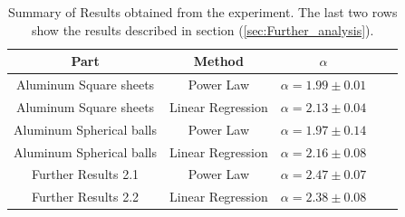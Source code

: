 \documentclass[a4paper,12pt]{article}
\begin{document}
\begin{table}[h!]
    \centering
    \caption{Summary of Results obtained from the experiment. The last two rows show the results described in section (\ref{sec:Further_analysis}).}
    \label{tab:summary_results}
    \begin{tabular}{|c|c|c|c|c|}
    \hline
    \textbf{Part} & \textbf{Method} & \textbf{$\alpha$}   \\ \hline
    Aluminum Square sheets & Power Law & $\alpha = 1.99 \pm 0.01$   \\ \hline
    Aluminum Square sheets & Linear Regression & $\alpha = 2.13 \pm 0.04$   \\ \hline
    Aluminum Spherical balls & Power Law & $\alpha = 1.97 \pm 0.14$  \\ \hline
    Aluminum Spherical balls & Linear Regression & $\alpha = 2.16 \pm 0.08$   \\ \hline
    Further Results 2.1 & Power Law & $\alpha = 2.47 \pm 0.07$  \\ \hline
    Further Results 2.2 & Linear Regression & $\alpha = 2.38 \pm 0.08$ \\ \hline
    \end{tabular}
    \end{table}
 




\end{document}

